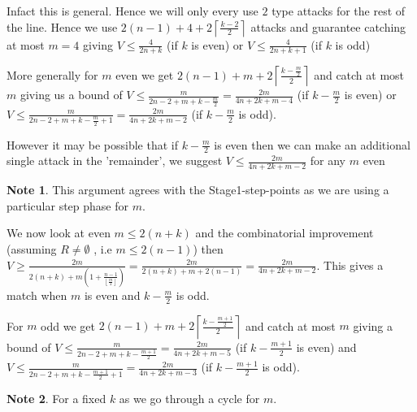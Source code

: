 \documentclass[a4paper,10pt]{article}
\newcommand{\floor}[1]{\left \lfloor #1 \right \rfloor}
\newcommand{\ceil}[1]{\left \lceil #1 \right \rceil}
\theoremstyle{definition}
\theoremstyle{definition}
\theoremstyle{remark}
\theoremstyle{definition}
\newtheorem*{note}{Note}
\begin{document}
Infact this is general. Hence we will only every use $2$ type attacks for the rest of the line. Hence we use $2(n-1)+4+2\ceil{\frac{k-2}{2}}$ attacks and guarantee catching at most $m=4$ giving $V \leq \frac{4}{2n+k}$ (if $k$ is even) or $V \leq \frac{4}{2n+k+1}$ (if $k$ is odd)

More generally for $m$ even we get $2(n-1)+m+2\ceil{\frac{k-\frac{m}{2}}{2}}$ and catch at most $m$ giving us a bound of $V \leq \frac{m}{2n-2+m+k-\frac{m}{2}}=\frac{2m}{4n+2k+m-4}$ (if $k-\frac{m}{2}$ is even) or $V \leq \frac{m}{2n-2+m+k-\frac{m}{2}+1}=\frac{2m}{4n+2k+m-2}$ (if $k-\frac{m}{2}$ is odd).

However it may be possible that if $k-\frac{m}{2}$ is even then we can make an additional single attack in the 'remainder', we suggest $V \leq \frac{2m}{4n+2k+m-2}$ for any $m$ even

\begin{note}
This argument agrees with the Stage1-step-points as we are using a particular step phase for $m$.
\end{note}

We now look at even $m \leq 2(n+k)$ and the combinatorial improvement (assuming $R \neq \emptyset$ , i.e $m \leq 2(n-1)$)
then $V \geq \frac{2m}{2(n+k)+m(1+\frac{n-1}{\floor{\frac{m}{2}}})}=\frac{2m}{2(n+k)+m+2(n-1)}=\frac{2m}{4n+2k+m-2}$. This gives a match when $m$ is even and $k-\frac{m}{2}$ is odd.

For $m$ odd we get $2(n-1)+m+2\ceil{\frac{k-\frac{m+1}{2}}{2}}$ and catch at most $m$ giving a bound of $V \leq \frac{m}{2n-2+m+k-\frac{m+1}{2}}=\frac{2m}{4n+2k+m-5}$ (if $k-\frac{m+1}{2}$ is even) and $V \leq \frac{m}{2n-2+m+k-\frac{m+1}{2}+1}=\frac{2m}{4n+2k+m-3}$ (if $k-\frac{m+1}{2}$ is odd).


\begin{note}
For a fixed $k$ as we go through a cycle for $m$.
\end{note}
\end{document}
